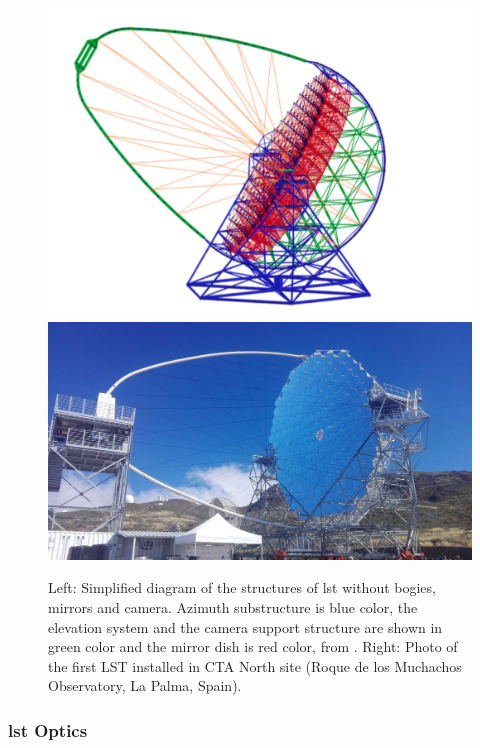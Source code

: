 \documentclass[main.tex]{subfiles}
\begin{document}
  \begin{figure}[!htb]
    \includegraphics[width=\linewidth]{Pictures/LSTstructure.pdf}
    \endminipage\hfill
    \includegraphics[width=\linewidth]{Pictures/LST1.pdf}
    \endminipage\hfill
    \caption{\label{fig:LST} Left: Simplified diagram of the structures of \gls{lst} without bogies, mirrors and camera. Azimuth substructure is blue color, the elevation system and the camera support structure are shown in green color and the mirror dish is red color, from \cite{2013LST}. Right: Photo of the first LST installed in CTA North site (Roque de los Muchachos Observatory, La Palma, Spain).}
  \end{figure}
  
  \subsubsection{\gls{lst} Optics}
\end{document}
